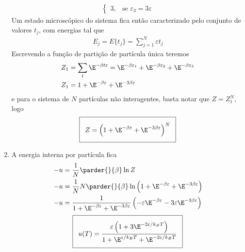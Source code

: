 \begin{prob}
\begin{sol}
\begin{enumerate}[label=\alph *)]
\begin{align}
\begin{cases}
          3,& \textrm{se }\varepsilon_3=3\varepsilon
        \end{cases}
      \end{align}
      Um estado microscópico do sistema fica então caracterizado pelo conjunto de valores ${t_j}$, com energias tal que
      \begin{align}
        E_j=E\{t_j\}=\sum_{j=1}^N\varepsilon t_j
      \end{align}
      Escrevendo a função de partição de partícula única teremos
      \begin{align}
        \begin{split}
          Z_1&=\sum_t\E^{-\beta t\varepsilon}=\E^{-\beta\varepsilon_1}+\E^{-\beta\varepsilon_2}+\E^{-\beta\varepsilon_3}\\
          Z_1&=1+\E^{-\beta\varepsilon}+\E^{-3\beta\varepsilon}
        \end{split}
      \end{align}
      e para o sistema de $N$ partículas não interagentes, basta notar que $Z=Z_1^N$, logo
      \begin{align}
        \addtolength{\fboxsep}{5pt}
        \boxed{
          \begin{gathered}
            Z=\left(1+\E^{-\beta\varepsilon}+\E^{-3\beta\varepsilon}\right)^N
          \end{gathered}
        }
      \end{align}
      \item A energia interna por partícula fica
      \begin{align}
        \begin{split}
          -u&=\frac{1}{N}\parder{}{\beta}\ln Z\\
          -u&=\frac{1}{N}N\parder{}{\beta}\ln\left(1+\E^{-\beta\varepsilon}+\E^{-3\beta\varepsilon}\right)\\
          -u&=\frac{1}{1+\E^{-\beta\varepsilon}+\E^{-3\beta\varepsilon}}\left(-\varepsilon\E^{-\beta\varepsilon}-3\varepsilon\E^{-3\beta\varepsilon}\right)
        \end{split}
      \end{align}
      \begin{align}
        \addtolength{\fboxsep}{5pt}
        \boxed{
          \begin{gathered}
            u(T)=\frac{\varepsilon\left(1+3\E^{-2\varepsilon/k_BT}\right)}{1+\E^{\varepsilon/k_BT}+\E^{-2\varepsilon/k_BT}}
          \end{gathered}
        }
      \end{align}

\end{enumerate}
\end{sol}
\end{prob}
